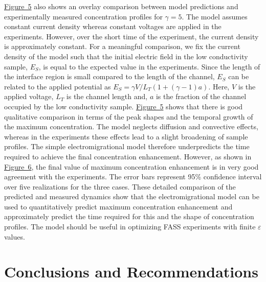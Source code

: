 \documentclass[lineno,authoryear]{FLO_v1}%
\theoremstyle{definition}
\begin{document}
\hyperref[fig5]{Figure~5} also shows an overlay comparison
between model predictions and experimentally measured
concentration profiles for $\gamma=5$. The model assumes
constant current density whereas constant voltages are
applied in the experiments. However, over the short time of
the experiment, the current density is approximately
constant. For a meaningful comparison, we fix the current
density of the model such that the initial electric field
in the low conductivity sample, $E_{S}$, is equal to the
expected value in the experiments. Since the length of the
interface region is small compared to the length of the
channel, $E_{S}$ can be related to the applied potential as
$E_S =\gamma V/L_T (1+(\gamma -1)a)$. Here, $V$ is the
applied voltage, $L_{T}$ is the channel length and, $a$ is
the fraction of the channel occupied by the low
conductivity sample. \hyperref[fig5]{Figure~5} shows that
there is good qualitative comparison in terms of the peak
shapes and the temporal growth of the maximum
concentration. The model neglects diffusion and convective
effects, whereas in the experiments these effects lead to a
slight broadening of sample profiles. The simple
electromigrational model therefore underpredicts the time
required to achieve the final concentration enhancement.
However, as shown in \hyperref[fig6]{Figure~6}, the final
value of maximum concentration enhancement is in very good
agreement with the experiments. The error bars represent
95{\%} confidence interval over five realizations for the
three cases. These detailed comparison of the predicted and
measured dynamics show that the electromigrational model
can be used to quantitatively predict maximum concentration
enhancement and approximately predict the time required for
this and the shape of concentration profiles. The model
should be useful in optimizing FASS experiments with finite
$\varepsilon$ values.

\vspace*{-5pt}
\section{Conclusions and Recommendations}
\end{document}
